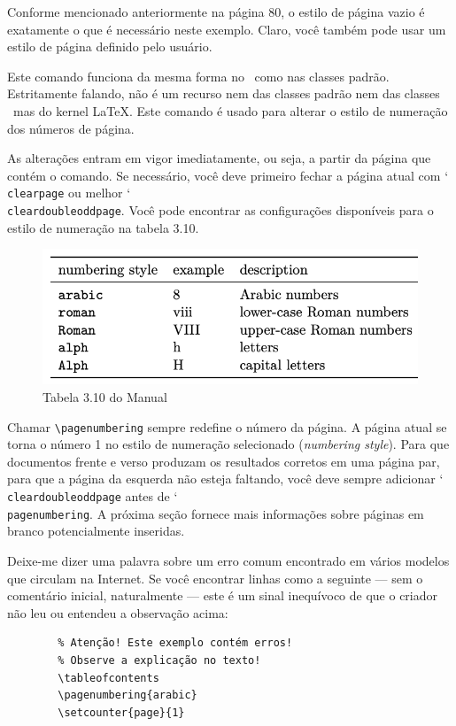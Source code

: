 Conforme mencionado anteriormente na página 80, o estilo de página vazio é exatamente o que é necessário neste exemplo. Claro, você também pode usar um estilo de página definido pelo usuário.


Este comando funciona da mesma forma no \KOMAScript\ como nas classes padrão. Estritamente falando, não é um recurso nem das classes padrão nem das classes \KOMAScript\ mas do kernel \LaTeX. Este comando é usado para alterar o estilo de numeração dos números de página.

As alterações entram em vigor imediatamente, ou seja, a partir da página que contém o comando. Se necessário, você deve primeiro fechar a página atual com \char`\\\texttt{clear\-page} ou melhor \char`\\\texttt{clear\-dou\-ble\-odd\-page}. Você pode encontrar as configurações disponíveis para o estilo de numeração na tabela 3.10.

\begin{figure}[hb]
    \centering
    \includegraphics[width=0.7\linewidth]{imagens/tab3_10.png}
    \caption{Tabela 3.10 do Manual}
    \label{fig:tab3_10}
\end{figure}

Chamar \verb|\pagenumbering| sempre redefine o número da página. A página atual se torna o número 1 no estilo de numeração selecionado (\textit{numbering style}). Para que documentos frente e verso produzam os resultados corretos em uma página par, para que a página da esquerda não esteja faltando, você deve sempre adicionar \char`\\\texttt{clear\-dou\-ble\-odd\-pa\-ge} antes de \char`\\\texttt{pa\-ge\-num\-be\-ring}. A próxima seção fornece mais informações sobre páginas em branco potencialmente inseridas.

Deixe-me dizer uma palavra sobre um erro comum encontrado em vários modelos que circulam na Internet. Se você encontrar linhas como a seguinte — sem o comentário inicial, naturalmente — este é um sinal inequívoco de que o criador não leu ou entendeu a observação acima:
\begin{verbatim}
        % Atenção! Este exemplo contém erros!
        % Observe a explicação no texto!
        \tableofcontents
        \pagenumbering{arabic}
        \setcounter{page}{1}
\end{verbatim}

